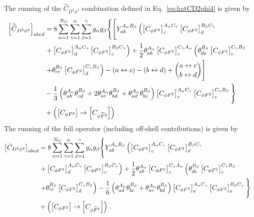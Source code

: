 The running of the $\widehat C_{D^2\phi^4}$ combination defined in Eq.~\eqref{eq:hatCD2phi4} is given by 
\begin{align}
    \left[\dot{\widehat{C}}_{D^2\phi^4}\right]_{abcd} &
    = 8 \sum_{\alpha=1}^{N_G}\sum_{\gamma=1}^{\alpha}
    \sum_{\beta=1}^{\gamma}g_\alpha g_\beta 
    \Bigg\{\Bigg[Y_{ab}^{A_\alpha B_\beta} 
    \left(\left[C_{\phi F^2}\right]^{A_\alpha C_\gamma}_c
    \left[C_{\phi F^2}\right]^{B_\beta C_\gamma}_d
    \right.\nonumber\\
    &\left.+ \left[C_{\phi F^2}\right]^{A_\alpha C_\gamma}_d
    \left[C_{\phi F^2}\right]^{B_\beta C_\gamma}_c\right)  +\frac{1}{2}\theta^{A_\alpha}_{ab}
    \left[C_{\phi F^2}\right]^{C_\gamma A_\alpha}_e 
    \left( \theta^{B_\beta}_{de} \left[C_{\phi F^2}\right]^{C_\gamma B_\beta}_c 
    \right.\nonumber\\
    &\left.+ \theta^{B_\beta}_{ce} 
    \left[C_{\phi F^2}\right]^{C_\gamma B_\beta}_d\right)  - (a \leftrightarrow c) 
    - (b\leftrightarrow d) + 
    \binom{a\leftrightarrow c}
    {b\leftrightarrow d} \Bigg]\nonumber\\
    & - \frac{1}{3}  \left(\theta^{A_\alpha}_{ab}
    \theta^{B_\beta}_{cd} + 2\theta^{A_\alpha}_{ac}
    \theta^{B_\beta}_{bd}+\theta^{A_\alpha}_{ad}
    \theta^{B_\beta}_{bc}\right)
    \left[C_{\phi F^2}\right]^{A_\alpha C_\gamma}_e 
    \left[C_{\phi F^2}\right]^{C_\gamma B_\beta}_e 
    \Bigg\}\nonumber \\
    &+\left(\left[C_{\phi F^2}\right]
    \to \left[C_{\phi \widetilde{F}^2}\right]\right)\,.
\end{align}
The running of the full operator (including off-shell contributions) is given by
\begin{align}
    \left[\dot{C}_{D^2\phi^4}\right]_{abcd} &
    = 8 \sum_{\alpha=1}^{N_G}\sum_{\gamma=1}^{\alpha}
    \sum_{\beta=1}^{\gamma}g_\alpha g_\beta 
    \Bigg\{Y_{ab}^{A_\alpha B_\beta} \left(
    \left[C_{\phi F^2}\right]^{A_\alpha C_\gamma}_c
    \left[C_{\phi F^2}\right]^{B_\beta C_\gamma}_d 
    \right.\nonumber\\
    &\left.+ \left[C_{\phi F^2}\right]^{A_\alpha C_\gamma}_d
    \left[C_{\phi F^2}\right]^{B_\beta C_\gamma}_c\right) +\frac{1}{2}\theta^{A_\alpha}_{ab}
    \left[C_{\phi F^2}\right]^{C_\gamma A_\alpha}_e 
    \left( \theta^{B_\beta}_{de} 
    \left[C_{\phi F^2}\right]^{C_\gamma B_\beta}_c 
    \right.\nonumber\\
    &\left.+ \theta^{B_\beta}_{ce}
    \left[C_{\phi F^2}\right]^{C_\gamma B_\beta}_d\right)   -\frac{1}{6}\left(\theta^{A_\alpha}_{ad}
    \theta^{B_\beta}_{bc}+\theta^{A_\alpha}_{ac}
    \theta^{B_\beta}_{bd}\right)
    \left[C_{\phi F^2}\right]^{A_\alpha C_\gamma }_e 
    \left[C_{\phi F^2}\right]^{B_\beta C_\gamma }_e \Bigg\}\nonumber\\
    &+\left(\left[C_{\phi F^2}\right]
    \to \left[C_{\phi \widetilde{F}^2}\right]\right)\,.
    \label{eq:D2phi4_phiF22}
\end{align}

